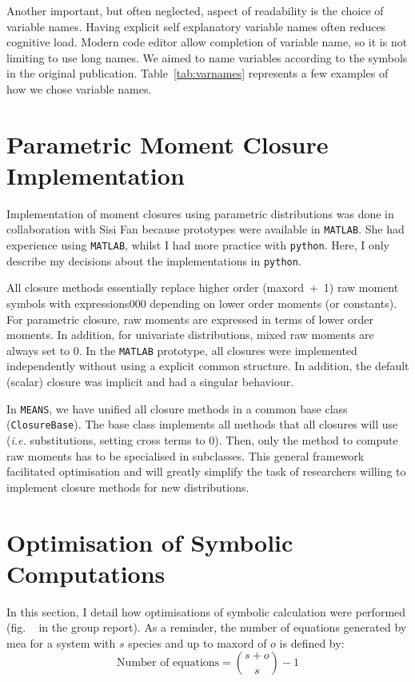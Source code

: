 \documentclass[11pt,a4paper]{article}
\newcommand{\means}{\texttt{MEANS}}
\newcommand{\py}{\texttt{python}}
\newcommand{\mat}{\texttt{MATLAB}}
\newcommand{\ie}{\emph{i.e.}}
\newcommand{\citationneeded}[2][]{\todo[color=brown, fancyline, #1]{\textbf{Citation Needed:} #2}}
\begin{document}
Another important, but often neglected, aspect of readability is the choice of variable names.
Having explicit self explanatory variable names often reduces cognitive load.
Modern code editor allow completion of variable name, so it is not limiting to use long names.
We aimed to name variables according to the symbols in the original publication\cite{ale_general_2013}.
Table~\ref{tab:varnames} represents a few examples of how we chose variable names.


\section{Parametric Moment Closure Implementation}
Implementation of moment closures using parametric distributions was done in collaboration
with Sisi Fan because prototypes were available in \mat{}\cite{lakatos_preparation_2014}. She had experience using \mat{},
whilst I had more practice with \py{}.
Here, I only describe my decisions about the implementations in \py{}.

All closure methods essentially replace higher order (\gls{maxord}~+~1) raw moment symbols with expressions000 depending on lower order moments (or constants).
For parametric closure, raw moments are expressed in terms of lower order moments.
In addition, for univariate distributions, mixed raw moments are always set to $0$.
In the \mat{} prototype, all closures were implemented independently without using a explicit common structure.
In addition, the default (scalar) closure was implicit and had a singular behaviour.

In \means, we have unified all closure methods in a common base class (\texttt{ClosureBase}).
The base class implements all methods that all closures will use (\ie{} substitutions, setting cross terms to $0$).
Then, only the method to compute raw moments has to be specialised in subclasses.
This general framework facilitated optimisation and will greatly simplify the task of researchers willing
to implement closure methods for new distributions.

\section{Optimisation of Symbolic Computations}

\label{sec:optimisation}

In this section, I detail how optimisations of symbolic calculation were performed (fig. ~\citationneeded{find me} in the group report).
As a reminder, the number of equations generated by \gls{mea} for a system with $s$ species and up to \gls{maxord} of $o$
is defined by:
\begin{equation}
    \text{Number of equations} = {{s + o} \choose {s}} - 1
    \label{eq:number_of_equations}
\end{equation}
\end{document}
